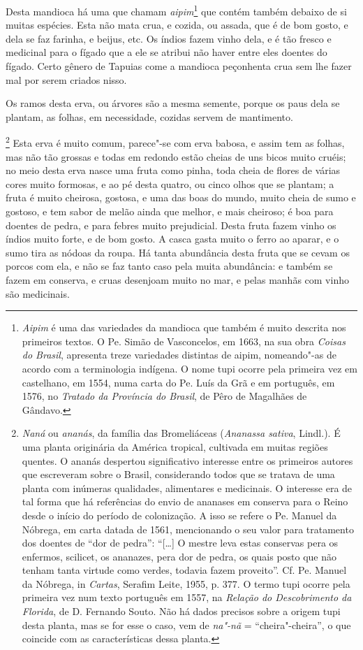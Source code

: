  Desta mandioca há uma que chamam \textit{aipim}\footnote{ \textit{Aipim} 
é uma das variedades da mandioca que também é muito
descrita nos primeiros textos. O Pe. Simão de Vasconcelos, em 1663, na
sua obra \textit{Coisas do Brasil}, apresenta treze variedades
distintas de aipim, nomeando"-as de acordo com a terminologia indígena.
O nome tupi ocorre pela primeira vez em castelhano, em 1554, numa
carta do Pe. Luís da Grã e em português, em 1576, no
\textit{Tratado da Província do Brasil}, de Pêro de Magalhães de Gândavo.} 
 que contém também debaixo de si muitas espécies. Esta não mata crua, e
cozida, ou assada, que é de bom gosto, e dela se faz farinha, e beijus,
etc. Os índios fazem vinho dela, e é tão fresco e medicinal para o
fígado que a ele se atribui não haver entre eles doentes do fígado.
Certo gênero de Tapuias come a mandioca peçonhenta crua sem lhe fazer
mal por serem criados nisso.

 Os ramos desta erva, ou árvores são a mesma semente, porque os paus
dela se plantam, as folhas, em necessidade, cozidas servem de mantimento. 

\footnote{ \textit{Naná} ou \textit{ananás}, 
da família das Bromeliáceas (\textit{Ananassa sativa}, Lindl.). É uma
planta originária da América tropical, cultivada em muitas regiões
quentes. O ananás despertou significativo interesse entre os primeiros
autores que escreveram sobre o Brasil, considerando todos que se
tratava de uma planta com inúmeras qualidades, alimentares e
medicinais. O interesse era de tal forma que há referências do envio de
ananases em conserva para o Reino desde o início do período de
colonização. A isso se refere o Pe. Manuel da Nóbrega, em carta datada
de 1561, mencionando o seu valor para tratamento dos doentes de ``dor
de pedra'': ``[\ldots{}] O mestre leva estas conservas pera os enfermos,
scilicet, os ananazes, pera dor de pedra, os quais posto que não tenham
tanta virtude como verdes, todavia fazem proveito''. Cf. Pe. Manuel da
Nóbrega, in \textit{Cartas}, Serafim Leite, 1955, p. 377. O termo tupi
ocorre pela primeira vez num texto português em 1557, na
\textit{Relação do Descobrimento da Florida}, de D. Fernando Souto. Não
há dados precisos sobre a origem tupi desta planta, mas se for esse o
caso, vem de \textit{na"-nã} = ``cheira"-cheira'', o que coincide com as
características dessa planta.} Esta erva é muito comum,
parece"-se com erva babosa, e assim tem as folhas, mas não tão grossas e
todas em redondo estão cheias de uns bicos muito cruéis; no meio desta
erva nasce uma fruta como pinha, toda cheia de flores de várias cores
muito formosas, e ao pé desta quatro, ou cinco olhos que se plantam; a
fruta é muito cheirosa, gostosa, e uma das boas do mundo, muito cheia
de sumo e gostoso, e tem sabor de melão ainda que melhor, e mais
cheiroso; é boa para doentes de pedra, e para febres muito prejudicial.
Desta fruta fazem vinho os índios muito forte, e de bom gosto. A casca
gasta muito o ferro ao aparar, e o sumo tira as nódoas da roupa. Há
tanta abundância desta fruta que se cevam os porcos com ela, e não se
faz tanto caso pela muita abundância: e também se fazem em conserva, e
cruas desenjoam muito no mar, e pelas manhãs com vinho são \mbox{medicinais.} \enlargethispage{\baselineskip}

